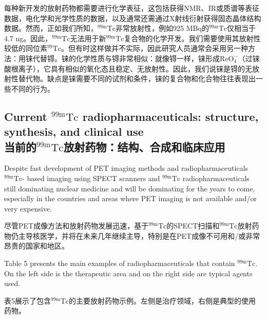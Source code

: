 \documentclass[dvipsnames, svgnames,a4paper,11pt]{article}
\begin{document}
每种新开发的放射药物都需要进行化学表征，这包括获得NMR、IR或质谱等表征数据，电化学和光学性质的数据，以及通常还需通过X射线衍射获得固态晶体结构数据。然而，正如我们所知，${}^\mathrm{99m}\mathrm{Tc}$非常放射性，例如925 MBq的${}^\mathrm{99m}\mathrm{Tc}$仅相当于4.7 ng。因此，${}^\mathrm{99m}\mathrm{Tc}$无法用于新${}^\mathrm{99m}\mathrm{Tc}$复合物的化学开发。我们需要使用其放射性较低的同位素$\mathrm{{}^{99}Tc}$。但有时这样做并不实际，因此研究人员通常会采用另一种方法：用铼代替锝。铼的化学性质与锝非常相似：就像锝一样，铼形成$\mathrm{ReO_4^-}$（过铼酸根离子），它具有相似的氧化态且稳定、无放射性。因此，我们说铼是锝的无放射性替代物。缺点是铼需要不同的试剂和条件，铼的复合物和化合物往往表现出一些不同的行为。

\subsection{Current ${}^\mathrm{99m}\mathrm{Tc}$ radiopharmaceuticals: structure, synthesis, and clinical use\\当前的${}^\mathrm{99m}\mathrm{Tc}$放射药物：结构、合成和临床应用}

Despite fast development of PET imaging methods and radiopharmaceuticals ${}^\mathrm{99m}\mathrm{Tc}$-
based imaging using SPECT scanners and ${}^\mathrm{99m}\mathrm{Tc}$ radiopharmaceuticals still
dominating nuclear medicine and will be dominating for the years to come, especially
in the countries and areas where PET imaging is not available and/or very expensive.

尽管PET成像方法和放射药物发展迅速，基于${}^\mathrm{99m}\mathrm{Tc}$的SPECT扫描和${}^\mathrm{99m}\mathrm{Tc}$放射药物仍主导核医学，并将在未来几年继续主导，特别是在PET成像不可用和/或非常昂贵的国家和地区。

Table 5 presents the main examples of radiopharmaceuticals that contain ${}^\mathrm{99m}\mathrm{Tc}$. On
the left side is the therapeutic area and on the right side are typical agents used.

表5展示了包含${}^\mathrm{99m}\mathrm{Tc}$的主要放射药物示例。左侧是治疗领域，右侧是典型的使用药物。
\end{document}
